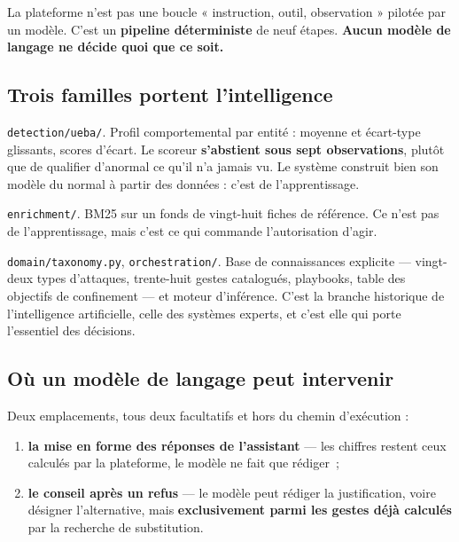 La plateforme n'est pas une boucle « instruction, outil, observation » pilotée
par un modèle. C'est un \textbf{pipeline déterministe} de neuf étapes.
\textbf{Aucun modèle de langage ne décide quoi que ce soit.}

\subsection{Trois familles portent l'intelligence}

\begin{description}[leftmargin=*, style=nextline]
  \item[Apprentissage statistique non supervisé] \texttt{detection/ueba/}.
        Profil comportemental par entité : moyenne et écart-type glissants,
        scores d'écart. Le scoreur \textbf{s'abstient sous sept observations},
        plutôt que de qualifier d'anormal ce qu'il n'a jamais vu. Le système
        construit bien son modèle du normal à partir des données : c'est de
        l'apprentissage.
  \item[Recherche d'information] \texttt{enrichment/}. BM25 sur un fonds de
        vingt-huit fiches de référence. Ce n'est pas de l'apprentissage, mais
        c'est ce qui commande l'autorisation d'agir.
  \item[Raisonnement symbolique] \texttt{domain/taxonomy.py},
        \texttt{orchestration/}. Base de connaissances explicite — vingt-deux
        types d'attaques, trente-huit gestes catalogués, playbooks, table des
        objectifs de confinement — et moteur d'inférence. C'est la branche
        historique de l'intelligence artificielle, celle des systèmes experts,
        et c'est elle qui porte l'essentiel des décisions.
\end{description}

\subsection{Où un modèle de langage peut intervenir}

Deux emplacements, tous deux facultatifs et hors du chemin d'exécution :

\begin{enumerate}[leftmargin=*]
  \item \textbf{la mise en forme des réponses de l'assistant} — les chiffres
        restent ceux calculés par la plateforme, le modèle ne fait que
        rédiger~;
  \item \textbf{le conseil après un refus} — le modèle peut rédiger la
        justification, voire désigner l'alternative, mais
        \textbf{exclusivement parmi les gestes déjà calculés} par la recherche
        de substitution.
\end{enumerate}

